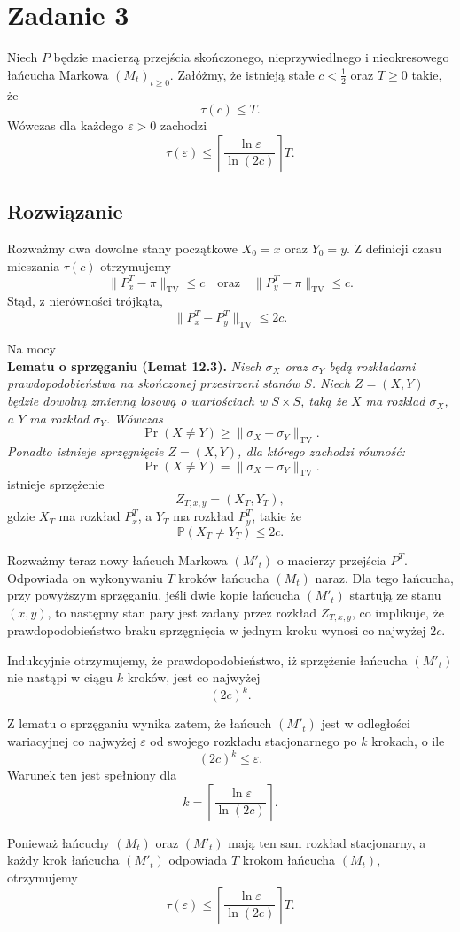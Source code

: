 \section{Zadanie 3}
Niech \(P\) będzie macierzą przejścia skończonego, nieprzywiedlnego i nieokresowego
łańcucha Markowa \((M_t)_{t \ge 0}\).
Załóżmy, że istnieją stałe \(c < \tfrac12\) oraz \(T \ge 0\) takie, że
\[
	\tau(c) \le T.
\]
Wówczas dla każdego \(\varepsilon > 0\) zachodzi
\[
	\tau(\varepsilon)
	\le
	\left\lceil \frac{\ln \varepsilon}{\ln(2c)} \right\rceil T.
\]

\subsection*{Rozwiązanie}
Rozważmy dwa dowolne stany początkowe \(X_0 = x\) oraz \(Y_0 = y\).
Z definicji czasu mieszania \(\tau(c)\) otrzymujemy
\[
	\|P_x^T - \pi\|_{\mathrm{TV}} \le c
	\quad \text{oraz} \quad
	\|P_y^T - \pi\|_{\mathrm{TV}} \le c.
\]
Stąd, z nierówności trójkąta,
\[
	\|P_x^T - P_y^T\|_{\mathrm{TV}} \le 2c.
\]

Na mocy\\
\medskip
\noindent
\textbf{Lematu o sprzęganiu (Lemat 12.3).}
\emph{
	Niech \(\sigma_X\) oraz \(\sigma_Y\) będą rozkładami prawdopodobieństwa
	na skończonej przestrzeni stanów \(S\).
	Niech \(Z=(X,Y)\) będzie dowolną zmienną losową o wartościach w \(S\times S\),
	taką że \(X\) ma rozkład \(\sigma_X\), a \(Y\) ma rozkład \(\sigma_Y\).
	Wówczas
	\[
		\Pr(X \neq Y) \ge \|\sigma_X - \sigma_Y\|_{\mathrm{TV}}.
	\]
	Ponadto istnieje sprzęgnięcie \(Z=(X,Y)\), dla którego zachodzi równość:
	\[
		\Pr(X \neq Y) = \|\sigma_X - \sigma_Y\|_{\mathrm{TV}}.
	\]
}
istnieje sprzężenie
\[
	Z_{T,x,y} = (X_T, Y_T),
\]
gdzie \(X_T\) ma rozkład \(P_x^T\), a \(Y_T\) ma rozkład \(P_y^T\), takie że
\[
	\mathbb{P}(X_T \neq Y_T) \le 2c.
\]

Rozważmy teraz nowy łańcuch Markowa \((M'_t)\) o macierzy przejścia \(P^T\).
Odpowiada on wykonywaniu \(T\) kroków łańcucha \((M_t)\) naraz.
Dla tego łańcucha, przy powyższym sprzęganiu, jeśli dwie kopie łańcucha
\((M'_t)\) startują ze stanu \((x,y)\), to następny stan pary jest zadany
przez rozkład \(Z_{T,x,y}\), co implikuje, że prawdopodobieństwo braku
sprzęgnięcia w jednym kroku wynosi co najwyżej \(2c\).

Indukcyjnie otrzymujemy, że prawdopodobieństwo, iż sprzężenie łańcucha
\((M'_t)\) nie nastąpi w ciągu \(k\) kroków, jest co najwyżej
\[
	(2c)^k.
\]

Z lematu o sprzęganiu wynika zatem, że łańcuch \((M'_t)\) jest w odległości
wariacyjnej co najwyżej \(\varepsilon\) od swojego rozkładu stacjonarnego
po \(k\) krokach, o ile
\[
	(2c)^k \le \varepsilon.
\]
Warunek ten jest spełniony dla
\[
	k = \left\lceil \frac{\ln \varepsilon}{\ln(2c)} \right\rceil.
\]

Ponieważ łańcuchy \((M_t)\) oraz \((M'_t)\) mają ten sam rozkład stacjonarny,
a każdy krok łańcucha \((M'_t)\) odpowiada \(T\) krokom łańcucha \((M_t)\),
otrzymujemy
\[
	\tau(\varepsilon)
	\le
	\left\lceil \frac{\ln \varepsilon}{\ln(2c)} \right\rceil T.
\]
